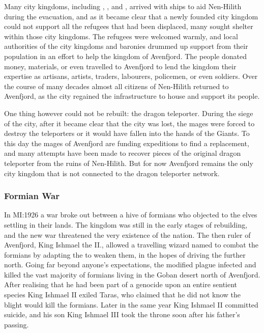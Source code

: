 Many city kingdoms, including , ,
and , arrived with ships to aid Nen-Hilith during
the evacuation, and as it became clear that a newly founded city kingdom could
not support all the refugees that had been displaced, many sought shelter
within those city kingdoms. The refugees were welcomed warmly, and local
authorities of the city kingdoms and baronies drummed up support from their
population in an effort to help the kingdom of Avenfjord. The people donated
money, materials, or even travelled to Avenfjord to lend the kingdom their
expertise as artisans, artists, traders, labourers, policemen, or even
soldiers. Over the course of many decades almost all citizens of Nen-Hilith
returned to Avenfjord, as the city regained the infrastructure to house and
support its people.

One thing however could not be rebuilt: the dragon teleporter. During the
siege of the city, after it became clear that the city was lost, the mages
were forced to destroy the teleporters or it would have fallen into the hands
of the Giants. To this day the mages of Avenfjord are funding expeditions to
find a replacement, and many attempts have been made to recover pieces of the
original dragon teleporter from the ruins of Nen-Hilith. But for now Avenfjord
remains the only city kingdom that is not connected to the dragon teleporter
network.

\subsubsection{Formian War}
\label{sec:Formian War}

In MI:1926 a war broke out between a hive of formians who objected to the
elves settling in their lands. The kingdom was still in the early stages of
rebuilding, and the new war threatened the very existence of the nation. The
then ruler of Avenfjord, King Ishmael the II., allowed a travelling wizard
named  to combat the formians by adapting the
 to weaken them, in the hopes of driving the further
north. Going far beyond anyone's expectations, the modified plague infected
and killed the vast majority of formians living in the Goban desert north of
Avenfjord. After realising that he had been part of a genocide upon an entire
sentient species King Ishmael II exiled Taras, who claimed that he did not
know the blight would kill the formians. Later in the same year King Ishmael
II committed suicide, and his son King Ishmael III took the throne soon after
his father's passing.

